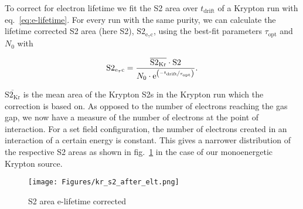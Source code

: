 To correct for electron lifetime we fit the S2 area over $ t_\mathrm{drift} $ of a Krypton run with eq.~\ref{eq:e-lifetime}.
For every run with the same purity, we can calculate the lifetime corrected S2 area (here S2), $ \mathrm{S2_\mathrm{e_\tau c}} $, using the best-fit parameters $ \tau_\mathrm{opt} $ and $ N_0 $ with

\begin{equation}
    \mathrm{S2_\mathrm{e_\tau c}} = \frac{ \overline{\mathrm{S2_{Kr}}} \cdot \mathrm{S2} }{ N_0 \cdot \mathrm{e}^{ \left( \nicefrac{-t_\mathrm{drift}}{\tau_\mathrm{opt}} \right)} }.  %
\end{equation}

$ \overline{\mathrm{S2_{Kr}}} $ is the mean area of the Krypton S2s in the Krypton run which the correction is based on.
As opposed to the number of electrons reaching the gas gap, we now have a measure of the number of electrons at the point of interaction.
For a set field configuration, the number of electrons created in an interaction of a certain energy is constant.
This gives a narrower distribution of the respective S2 areas as shown in fig.~\ref{fig:s2-area-hist-after-eltc} in the case of our monoenergetic Krypton source.


\begin{figure}
    \centering
    \texttt{[image: Figures/kr\_s2\_after\_elt.png]}  %
    \caption[S2 area e-lifetime corrected]{
        S2 area e-lifetime corrected
    }
    \label{fig:s2-area-hist-after-eltc}
\end{figure}


